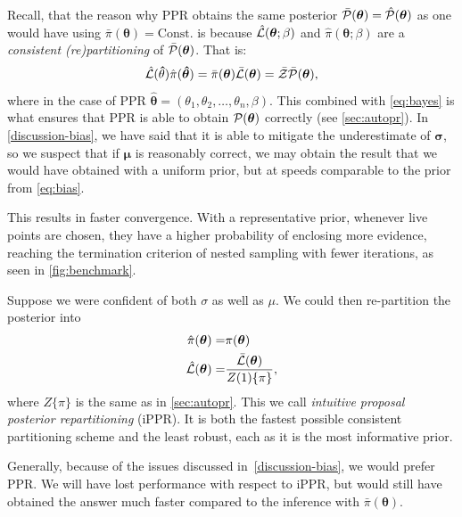 \documentclass[usenatbib]{mnras}
\begin{document}
Recall, that the reason why PPR obtains the same posterior
\( \bar{\cal P}(\bm{\theta})= \hat{\cal P}(\bm{\theta})\) as one
would have using \( \bar{\pi} (\bm{\theta}) = \text{Const.}\) is
because \( \hat{\cal L} (\bm{\theta};\beta)\) and
\( \hat{\pi} (\bm{\theta};\beta)\) are a \emph{consistent
  (re)partitioning} of \( \bar{\cal P}(\bm{\theta})\). That is:
\begin{equation}
  \label{eq:partitioning}
  \hat{\cal L} (\bm\hat{\theta}) \hat{\pi} (\bm{\hat{\theta}})  = \bar{\pi} (\bm{\theta}) \bar{\cal L} (\bm{\theta}) = \bar{\cal Z} \bar{\cal P}(\bm{\theta}), 
\end{equation}
where in the case of PPR
$\bm\hat{\theta} = (\theta_{1}, \theta_{2}, \ldots, \theta_{n},
\beta)$.  This combined with \cref{eq:bayes} is what ensures that PPR
is able to obtain \( {\cal P}(\bm{\theta})\) correctly (see
\cref{sec:autopr}). In \cref{discussion-bias}, we have said that it is
able to mitigate the underestimate of $\bm{\sigma}$, so we suspect that
if $\bm{\mu}$ is reasonably correct, we may obtain the result that we
would have obtained with a uniform prior, but at speeds comparable to
the prior from \cref{eq:bias}.

This results in faster convergence.  With a representative prior,
whenever live points are chosen, they have a higher probability of
enclosing more evidence, reaching the termination criterion of nested
sampling with fewer iterations, as seen in \cref{fig:benchmark}. 

Suppose we were confident of both \(\sigma\) as well as \(\mu\). We
could then re-partition the posterior into
\begin{equation}\label{eq:igpr}
  \begin{aligned}
    \hat{\pi} (\bm{\theta}) = &\pi(\bm{\theta})\\
    \hat{{\cal L}}(\bm{\theta}) = & \frac{\bar{\cal L}(\bm{\theta})}{Z(1)\{\pi\}},
  \end{aligned}
\end{equation}
where \(Z\{\pi\}\) is the same as in \cref{sec:autopr}.  This we call
\emph{intuitive proposal posterior repartitioning} (iPPR). It is both the
fastest possible consistent partitioning scheme and the least robust,
each as it is the most informative prior.

Generally, because of the issues discussed in~\vref{discussion-bias},
we would prefer PPR. We will have lost performance with respect to
iPPR, but would still have obtained the answer much faster compared to
the inference with \( \bar{\pi} (\bm{\theta})\).
\end{document}
